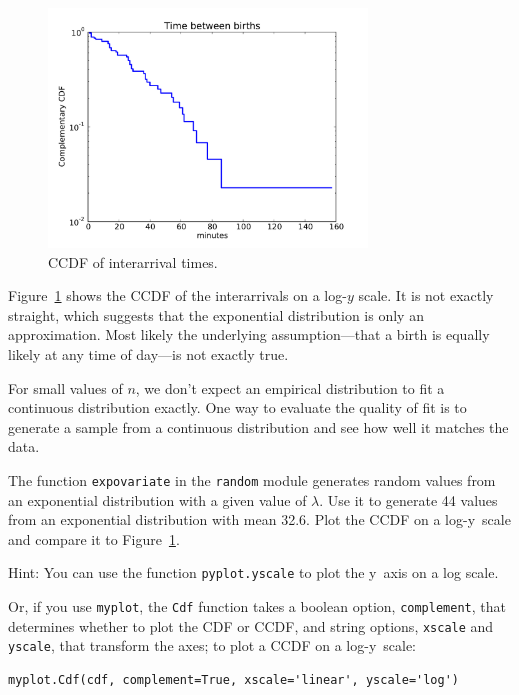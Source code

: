 \documentclass[12pt]{book}
\begin{document}
\begin{figure}
\centerline{\includegraphics[height=2.5in]{figs/interarrivals_logy.pdf}}
\caption{CCDF of interarrival times.}
\label{interarrival_ccdf}
\end{figure}

Figure~\ref{interarrival_ccdf} shows the CCDF of the interarrivals
on a log-$y$ scale.  It is not exactly straight, which suggests that
the exponential distribution is only an approximation.  Most likely
the underlying assumption---that a birth is equally likely at any time
of day---is not exactly true.

\begin{exercise}
For small values of $n$, we don't expect an empirical distribution
to fit a continuous distribution exactly.  One way to evaluate
the quality of fit is to generate a sample from a continuous
distribution and see how well it matches the data.

The function {\tt expovariate} in the {\tt random} module generates
random values from an exponential distribution with a given value of
$\lambda$.  Use it to generate 44 values from an exponential
distribution with mean 32.6.  Plot the CCDF on a log-y~scale and
compare it to Figure~\ref{interarrival_ccdf}.

Hint: You can use the function {\tt pyplot.yscale} to plot the y~axis
on a log scale.


Or, if you use {\tt myplot}, the {\tt Cdf} function takes a boolean
option, {\tt complement}, that determines whether to plot the CDF or
CCDF, and string options, {\tt xscale} and {\tt yscale}, that
transform the axes; to plot a CCDF on a log-y~scale:
%
\begin{verbatim}
myplot.Cdf(cdf, complement=True, xscale='linear', yscale='log') 
\end{verbatim}

\end{exercise}
\end{document}
